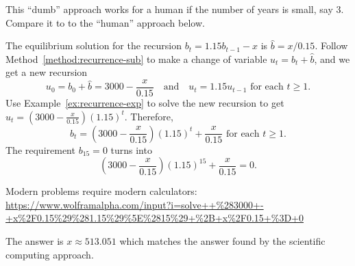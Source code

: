\documentclass[../main.tex]{subfiles}
\begin{document}
This ``dumb'' approach works for a human if the number of years is small, say \(3\). Compare it to to the ``human'' approach below.  

The equilibrium solution for the recursion \(b_{t} = 1.15 b_{t-1} - x\) is \(\hat{b} = x/0.15\). Follow Method~\ref{method:recurrence-sub} to make a change of variable \(u_{t} = b_{t} + \hat{b}\), and we get a new recursion
\[
  u_{0} = b_{0} + \hat{b} = 3000 - \frac{x}{0.15} \quad\text{and}\quad u_{t} = 1.15 u_{t-1} \text{ for each } t \ge 1.
\]
Use Example~\ref{ex:recurrence-exp} to solve the new recursion to get \(u_{t} = \left(3000 - \frac{x}{0.15}\right)(1.15)^{t}\). Therefore, 
\[
  b_{t} = \left(3000 - \frac{x}{0.15}\right)(1.15)^{t} + \frac{x}{0.15} \text{ for each } t \ge 1.
\]
The requirement \(b_{15} = 0\) turns into
\[
  \left(3000 - \frac{x}{0.15}\right)(1.15)^{15} + \frac{x}{0.15} = 0.
\]

Modern problems require modern calculators:
\url{https://www.wolframalpha.com/input?i=solve++%283000+-+x%2F0.15%29%281.15%29%5E%2815%29+%2B+x%2F0.15+%3D+0}

The answer is \( x \approx 513.051 \) which matches the answer found by the scientific computing approach.
\end{document}
